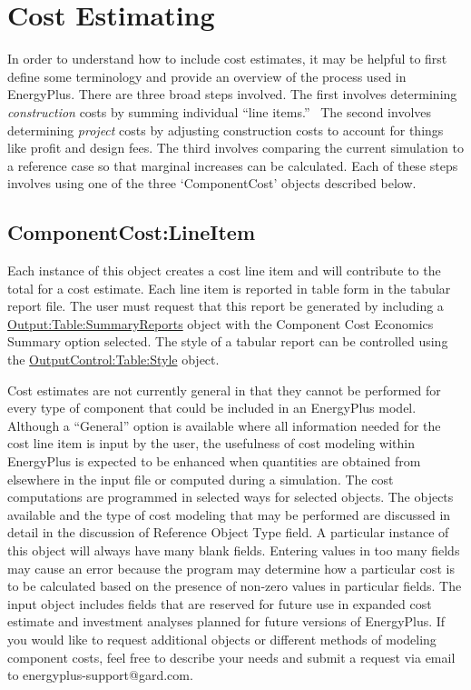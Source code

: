 \section{Cost Estimating}\label{cost-estimating}

In order to understand how to include cost estimates, it may be helpful to first define some terminology and provide an overview of the process used in EnergyPlus. There are three broad steps involved. The first involves determining \emph{construction} costs by summing individual ``line items.''~ The second involves determining \emph{project} costs by adjusting construction costs to account for things like profit and design fees. The third involves comparing the current simulation to a reference case so that marginal increases can be calculated. Each of these steps involves using one of the three `ComponentCost' objects described below.

\subsection{ComponentCost:LineItem}\label{componentcostlineitem}

Each instance of this object creates a cost line item and will contribute to the total for a cost estimate. Each line item is reported in table form in the tabular report file. The user must request that this report be generated by including a \hyperref[outputtablesummaryreports]{Output:Table:SummaryReports} object with the Component Cost Economics Summary option selected. The style of a tabular report can be controlled using the \hyperref[outputcontroltablestyle]{OutputControl:Table:Style} object.

Cost estimates are not currently general in that they cannot be performed for every type of component that could be included in an EnergyPlus model. Although a ``General'' option is available where all information needed for the cost line item is input by the user, the usefulness of cost modeling within EnergyPlus is expected to be enhanced when quantities are obtained from elsewhere in the input file or computed during a simulation. The cost computations are programmed in selected ways for selected objects. The objects available and the type of cost modeling that may be performed are discussed in detail in the discussion of Reference Object Type field. A particular instance of this object will always have many blank fields. Entering values in too many fields may cause an error because the program may determine how a particular cost is to be calculated based on the presence of non-zero values in particular fields. The input object includes fields that are reserved for future use in expanded cost estimate and investment analyses planned for future versions of EnergyPlus. If you would like to request additional objects or different methods of modeling component costs, feel free to describe your needs and submit a request via email to energyplus-support@gard.com.

